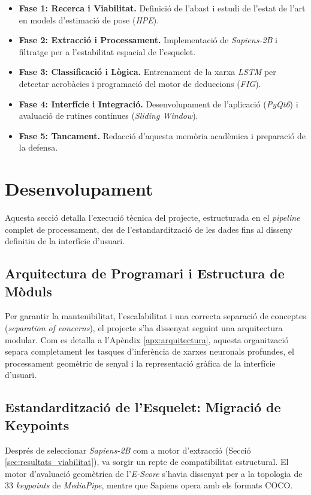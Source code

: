 \documentclass[10pt,a4paper,twocolumn,twoside]{article}
\begin{document}
\begin{itemize}
    \item \textbf{Fase 1: Recerca i Viabilitat.} Definició de l'abast i estudi de l'estat de l'art en models d'estimació de pose (\textit{HPE}).
    
    \item \textbf{Fase 2: Extracció i Processament.} Implementació de \textit{Sapiens-2B} i filtratge per a l'estabilitat espacial de l'esquelet.
    
    \item \textbf{Fase 3: Classificació i Lògica.} Entrenament de la xarxa \textit{LSTM} per detectar acrobàcies i programació del motor de deduccions (\textit{FIG}).
    
    \item \textbf{Fase 4: Interfície i Integració.} Desenvolupament de l'aplicació (\textit{PyQt6}) i avaluació de rutines contínues (\textit{Sliding Window}).
    
    \item \textbf{Fase 5: Tancament.} Redacció d'aquesta memòria acadèmica i preparació de la defensa.
\end{itemize}

\section{Desenvolupament}

Aquesta secció detalla l'execució tècnica del projecte, estructurada en el \textit{pipeline} complet de processament, des de l'estandardització de les dades fins al disseny definitiu de la interfície d'usuari.

\subsection{Arquitectura de Programari i Estructura de Mòduls}
Per garantir la mantenibilitat, l'escalabilitat i una correcta separació de conceptes (\textit{separation of concerns}), el projecte s'ha dissenyat seguint una arquitectura modular. Com es detalla a l'Apèndix \ref{apx:arquitectura}, aquesta organització separa completament les tasques d'inferència de xarxes neuronals profundes, el processament geomètric de senyal i la representació gràfica de la interfície d'usuari.

\subsection{Estandardització de l'Esquelet: Migració de Keypoints}
Després de seleccionar \textit{Sapiens-2B} com a motor d'extracció (Secció \ref{sec:resultats_viabilitat}), va sorgir un repte de compatibilitat estructural. El motor d'avaluació geomètrica de l'\textit{E-Score} s'havia dissenyat per a la topologia de 33 \textit{keypoints} de \textit{MediaPipe}, mentre que Sapiens opera amb els formats COCO.
\end{document}
